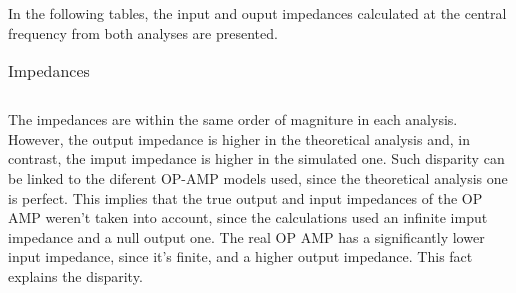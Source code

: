 In the following tables, the input and ouput impedances calculated at the central frequency from both analyses are presented.
\begin{table}[h!]
  \centering
  \begin{tabular}{|l|l|l|}
    \hline    
    
    
    
    \hline
  \end{tabular}
  \caption{Impedances}
\end{table}
\FloatBarrier   
The impedances are within the same order of magniture in each analysis. However, the output impedance is higher in the theoretical analysis and, in contrast, the imput impedance is higher in the simulated one. Such disparity can be linked to the diferent OP-AMP models used, since the theoretical analysis one is perfect. This implies that the true output and input impedances of the OP AMP weren't taken into account, since the calculations used an infinite imput impedance and a null output one. The real OP AMP has a significantly lower input impedance, since it's finite, and a higher output impedance. This fact explains the disparity. 


